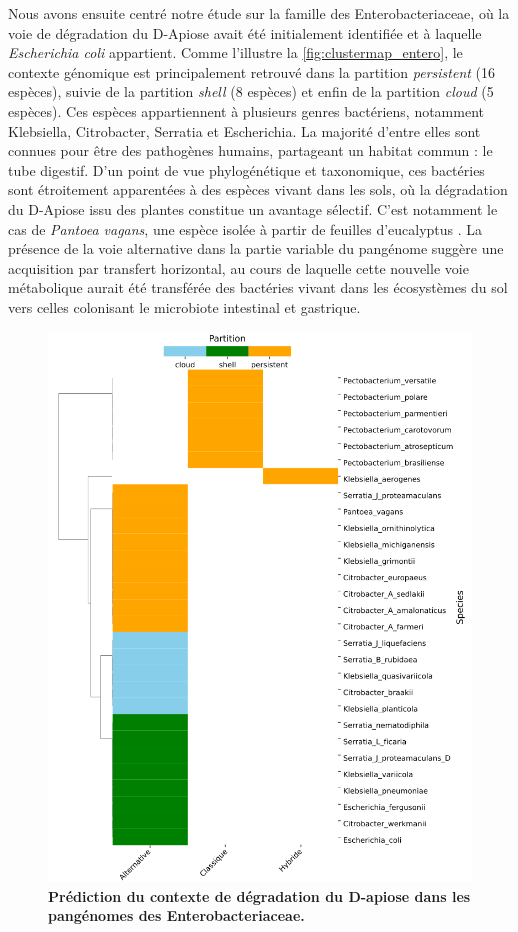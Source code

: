 Nous avons ensuite centré notre étude sur la famille des Enterobacteriaceae, où la voie de dégradation du D-Apiose avait été initialement identifiée \cite{carter_functional_2018} et à laquelle \textit{Escherichia coli} appartient.
Comme l'illustre la \autoref{fig:clustermap_entero}, le contexte génomique est principalement retrouvé dans la partition \textit{persistent} (16 espèces), suivie de la partition \textit{shell} (8 espèces) et enfin de la partition \textit{cloud} (5 espèces). 
Ces espèces appartiennent à plusieurs genres bactériens, notamment Klebsiella, Citrobacter, Serratia et Escherichia. La majorité d’entre elles sont connues pour être des pathogènes humains, partageant un habitat commun : le tube digestif. D’un point de vue phylogénétique et taxonomique, ces bactéries sont étroitement apparentées à des espèces vivant dans les sols, où la dégradation du D-Apiose issu des plantes constitue un avantage sélectif. C’est notamment le cas de \textit{Pantoea vagans}, une espèce isolée à partir de feuilles d’eucalyptus \cite{brady_pantoea_2009}.
La présence de la voie alternative dans la partie variable du pangénome suggère une acquisition par transfert horizontal, au cours de laquelle cette nouvelle voie métabolique aurait été transférée des bactéries vivant dans les écosystèmes du sol vers celles colonisant le microbiote intestinal et gastrique.

\begin{figure}[htbp] 
    \centering
    \includegraphics[width=.9\textwidth]{images/clustermap.png}
    \caption[Prédiction du contexte de dégradation du D-apiose dans les pangénomes des Enterobacteriaceae]{\textbf{Prédiction du contexte de dégradation du D-apiose dans les pangénomes des Enterobacteriaceae.}} 
    \label{fig:clustermap_entero}
\end{figure}

